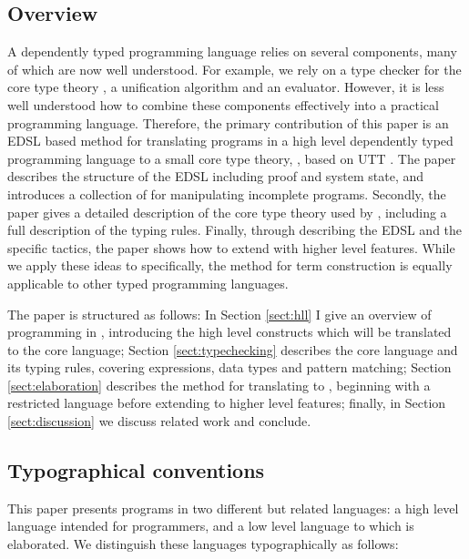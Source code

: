 \subsection{Overview}

A dependently typed programming language relies on several components, many of
which are now well understood. For example, we rely on a type checker for
the core type theory \cite{Chapman2005epigram,loh2010tutorial}, a
unification algorithm \cite{Miller1992} and an evaluator. However, it is less
well understood how to combine these components effectively into a practical
programming language. Therefore, the primary contribution of this paper is
an EDSL based method for translating programs in a
high level dependently typed programming language to a small core type theory,
\TT{}, based on UTT \cite{luo1994}. The paper describes the structure of the
EDSL including proof and system state, and introduces a collection of 
for manipulating incomplete programs.
Secondly, the paper gives a detailed description of the core type theory used
by \Idris{}, including a full description of the typing rules. Finally, through
describing the EDSL and the specific tactics, the paper shows how to extend
\Idris{} with higher level features.
While we apply these ideas to \Idris{} specifically, the method for term construction
is equally applicable to other typed programming languages.

The paper is structured as follows: In Section \ref{sect:hll} I give an overview of
programming in \Idris{}, introducing the high level constructs which will be
translated to the core language; Section \ref{sect:typechecking} describes the
core language \TT{} and its typing rules, covering expressions, data types
and pattern matching; Section \ref{sect:elaboration} describes the method
for translating \Idris{} to \TT{}, beginning with a restricted language
\IdrisM{} before extending to higher level features; finally, in 
Section \ref{sect:discussion} we discuss related work and conclude.


\subsection{Typographical conventions}

This paper presents programs in two different but related languages: a high level
language \Idris{} intended for programmers, and a low level language \TT{} to
which \Idris{} is elaborated. We distinguish these languages typographically as
follows:


